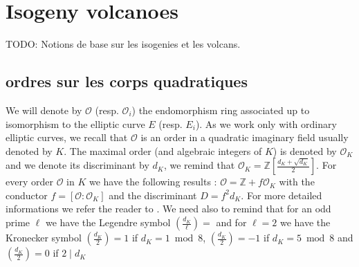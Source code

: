 \documentclass{lms}
\newcommand{\todo}[1]{{\color{red}TODO: #1}}
\begin{document}

\section{Isogeny volcanoes}
\label{sec:isogeny-volcanoes}

\todo{Notions de base sur les isogenies et les volcans.}

\subsection{ordres sur les corps quadratiques}%
We will denote by $\mathcal{O}$ (resp. $\mathcal{O}_i$) the endomorphism ring associated up to isomorphism to the elliptic curve $E$ (resp. $E_i$). As we work only with ordinary elliptic curves, we recall that $\mathcal{O}$ is an order in a quadratic imaginary field usually denoted by $K$. The maximal order (and algebraic integers of $K$) is denoted by $\mathcal{O}_K$ and we denote its discriminant by $d_K$, we remind that $\mathcal{O}_K=\mathbb{Z}[\frac{d_K+\sqrt{d_K}}{2}]$. For every order $\mathcal{O}$ in $K$ we have the following results : $\mathcal{O}= \mathbb{Z}+ f \mathcal{O}_K$ with the conductor $f=[\mathcal{O}:\mathcal{O}_K]$ and the discriminant $D=f^2d_K$. For more detailed informations we refer the reader to \cite{Cox89}. We need also to remind that for an odd prime $\ell$ we have the Legendre symbol $\left( \frac{d_K}{\ell} \right)=$ and for $\ell=2$ we have the Kronecker symbol $\left( \frac{d_K}{2} \right)= 1$ if $d_K = 1 \bmod 8$, $\left( \frac{d_K}{2} \right)= -1$ if $d_K = 5 \bmod 8$ and $\left( \frac{d_K}{2} \right)= 0$ if $2 \mid d_K$ %
\end{document}
